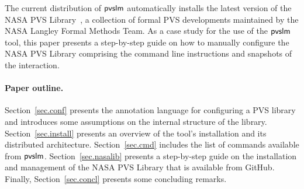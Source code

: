 The current distribution of $\textsf{pvslm}$ automatically installs the latest
version of the NASA PVS Library~\cite{nasalib}, a collection of formal
PVS developments maintained by the NASA Langley Formal Methods
Team. As a case study for the use of the $\textsf{pvslm}$ tool, this paper
presents a step-by-step guide on how to manually configure the NASA
PVS Library comprising the command line instructions and snapshots of
the interaction.

\paragraph{Paper outline.} Section~\ref{sec.conf} presents the
annotation language for configuring a PVS library and introduces some
assumptions on the internal structure of the library.
Section~\ref{sec.install} presents an overview of the tool's
installation and its distributed architecture.  Section~\ref{sec.cmd}
includes the list of commands available from $\textsf{pvslm}$.
Section~\ref{sec.nasalib} presents a step-by-step guide on the
installation and management of the NASA PVS Library that is available
from GitHub. Finally, Section~\ref{sec.concl} presents some concluding
remarks.
